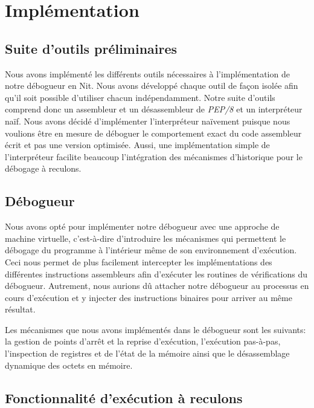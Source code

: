 \documentclass{article}
\begin{document}
\section{Implémentation}\label{impluxe9mentation}

\subsection{Suite d'outils
préliminaires}\label{suite-doutils-pruxe9liminaires}

Nous avons implémenté les différents outils nécessaires à
l'implémentation de notre débogueur en Nit. Nous avons développé chaque
outil de façon isolée afin qu'il soit possible d'utiliser chacun
indépendamment. Notre suite d'outils comprend donc un assembleur et un
désassembleur de \emph{PEP/8} et un interpréteur naïf. Nous avons décidé
d'implémenter l'interpréteur naïvement puisque nous voulions être en
mesure de déboguer le comportement exact du code assembleur écrit et pas
une version optimisée. Aussi, une implémentation simple de
l'interpréteur facilite beaucoup l'intégration des mécanismes
d'historique pour le débogage à reculons.

\subsection{Débogueur}\label{duxe9bogueur}

Nous avons opté pour implémenter notre débogueur avec une approche de
machine virtuelle, c'est-à-dire d'introduire les mécanismes qui
permettent le débogage du programme à l'intérieur même de son
environnement d'exécution. Ceci nous permet de plus facilement
intercepter les implémentations des différentes instructions assembleurs
afin d'exécuter les routines de vérifications du débogueur. Autrement,
nous aurions dû attacher notre débogueur au processus en cours
d'exécution et y injecter des instructions binaires pour arriver au
même résultat.

Les mécanismes que nous avons implémentés dans le débogueur sont les
suivants: la gestion de points d'arrêt et la reprise d'exécution,
l'exécution pas-à-pas, l'inspection de registres et de l'état de la
mémoire ainsi que le désassemblage dynamique des octets en mémoire.

\subsection{Fonctionnalité d'exécution à reculons}\label{fonctionnalite-dexecution-a-reculons}
\end{document}
